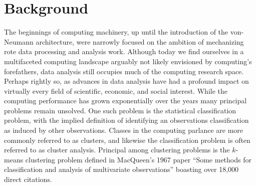 

\chapter{Background}\label{bkgrnd}

The beginnings of computing machinery, up until the introduction of the von-Neumann architecture, were narrowly focused
on the ambition of mechanizing rote data processing and analysis work.  Although today we find ourselves in a
multifaceted computing landscape arguably not likely envisioned by computing's forefathers, data analysis still occupies
much of the computing research space.  Perhaps rightly so, as advances in data analysis have had a profound impact on
virtually every field of scientific, economic, and social interest.  While the computing performance has grown
exponentially over the years many principal problems remain unsolved.  One such problem is the statistical
classification problem, with the implied definition of identifying an observations classification as induced by other
observations.  Classes in the computing parlance are more commonly referred to as clusters, and likewise the
classification problem is often referred to as cluster analysis.  Principal among clustering problems is the $k$-means
clustering problem defined in MacQueen's 1967 paper ``Some methods for classification and analysis of multivariate
observations'' \cite{macqueen-67} boasting over 18,000 direct citations.

